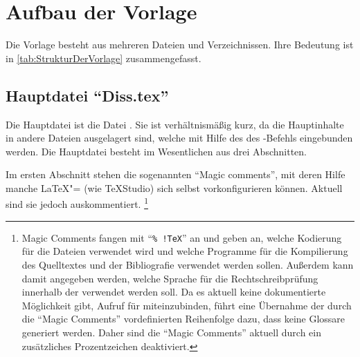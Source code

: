 \section{Aufbau der Vorlage}%
\label{sec:AufbauDerVorlage}
%
Die Vorlage besteht aus mehreren Dateien und Verzeichnissen.
Ihre Bedeutung ist in \cref{tab:StrukturDerVorlage} zusammengefasst.

\begingroup%
\small%
\renewcommand{\arraystretch}{2.0}%
\setlength{\tabcolsep}{0pt}%
\setlength{\topskip}{0pt}%
%
\endgroup%

\subsection[Hauptdatei \enquote{Diss.tex}]{Hauptdatei \enquote{Diss.tex}}%
%
\label{sec:Hauptdatei}
%
Die Hauptdatei ist die Datei .
Sie ist verhältnismäßig kurz, da die Hauptinhalte in andere Dateien ausgelagert sind, welche mit Hilfe des  \bzw des -Befehls eingebunden werden.
Die Hauptdatei besteht im Wesentlichen aus drei Abschnitten.

Im ersten Abschnitt stehen die sogenannten \enquote{Magic comments}, mit deren Hilfe manche \LaTeX"= (wie \zB TeXStudio) sich selbst vorkonfigurieren können.
Aktuell sind sie jedoch auskommentiert.%
\footnote{Magic Comments fangen mit \enquote{\texttt{\%~!TeX}} an und geben an, welche Kodierung für die Dateien verwendet wird 
und welche Programme für die Kompilierung des Quelltextes und der Bibliografie verwendet werden sollen.
Außerdem kann damit angegeben werden, welche Sprache für die Rechtschreibprüfung innerhalb der  verwendet werden soll.
Da es aktuell keine dokumentierte Möglichkeit gibt, Aufruf für  miteinzubinden,
führt eine Übernahme der durch die \enquote{Magic Comments} vordefinierten Reihenfolge dazu, dass keine Glossare generiert werden.
Daher sind die \enquote{Magic Comments} aktuell durch ein zusätzliches Prozentzeichen deaktiviert.}

